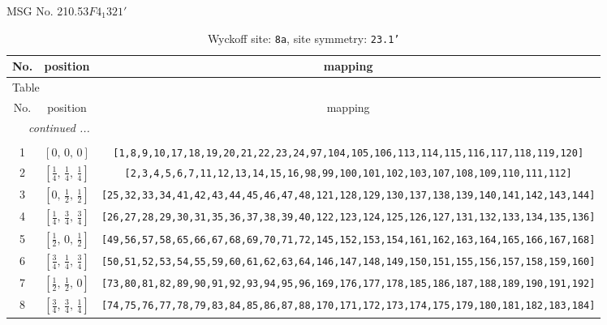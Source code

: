 \documentclass[fleqn,8pt]{jsarticle}
\begin{document}
\setcounter{MaxMatrixCols}{32}

\renewcommand{\tablename}{Table~}
\renewcommand{\figurename}{Figure~}
\begin{center}
\LARGE
MSG No. 210.53\quad$F4_{1}321'$
\end{center}
\renewcommand{\arraystretch}{1.2}
\begin{longtable}{ccc}
\caption{Wyckoff site: {\tt 8a}, site symmetry: {\tt 23.1'}}
 \\
 \hline \hline
No. & position & mapping \\ \hline \endfirsthead

\multicolumn{2}{l}{\tablename\ \thetable{}} \\
 \hline \hline
No. & position & mapping \\ \hline \endhead

 \hline \hline
\multicolumn{2}{r}{\footnotesize\it continued ...} \\ \endfoot

 \hline \hline
\multicolumn{2}{r}{} \\ \endlastfoot

1 & $\left[ 0,\, 0,\, 0 \right]$ & {\tt [1,8,9,10,17,18,19,20,21,22,23,24,97,104,105,106,113,114,115,116,117,118,119,120]} \\ \hline
2 & $\left[ \frac{1}{4},\, \frac{1}{4},\, \frac{1}{4} \right]$ & {\tt [2,3,4,5,6,7,11,12,13,14,15,16,98,99,100,101,102,103,107,108,109,110,111,112]} \\ \hline
3 & $\left[ 0,\, \frac{1}{2},\, \frac{1}{2} \right]$ & {\tt [25,32,33,34,41,42,43,44,45,46,47,48,121,128,129,130,137,138,139,140,141,142,143,144]} \\ \hline
4 & $\left[ \frac{1}{4},\, \frac{3}{4},\, \frac{3}{4} \right]$ & {\tt [26,27,28,29,30,31,35,36,37,38,39,40,122,123,124,125,126,127,131,132,133,134,135,136]} \\ \hline
5 & $\left[ \frac{1}{2},\, 0,\, \frac{1}{2} \right]$ & {\tt [49,56,57,58,65,66,67,68,69,70,71,72,145,152,153,154,161,162,163,164,165,166,167,168]} \\ \hline
6 & $\left[ \frac{3}{4},\, \frac{1}{4},\, \frac{3}{4} \right]$ & {\tt [50,51,52,53,54,55,59,60,61,62,63,64,146,147,148,149,150,151,155,156,157,158,159,160]} \\ \hline
7 & $\left[ \frac{1}{2},\, \frac{1}{2},\, 0 \right]$ & {\tt [73,80,81,82,89,90,91,92,93,94,95,96,169,176,177,178,185,186,187,188,189,190,191,192]} \\ \hline
8 & $\left[ \frac{3}{4},\, \frac{3}{4},\, \frac{1}{4} \right]$ & {\tt [74,75,76,77,78,79,83,84,85,86,87,88,170,171,172,173,174,175,179,180,181,182,183,184]} \\
\end{longtable}
\end{document}
